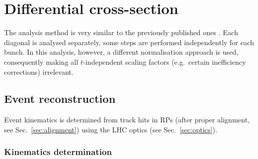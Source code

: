 \section{Differential cross-section}

The analysis method is very similar to the previously published ones \cite{prl111,epl101-el}. Each diagonal is analysed separately, some steps are performed independently for each bunch. In this analysis, however, a different normalisation approach is used, consequently making all $t$-independent scaling factors (e.g.~certain inefficiency corrections) irrelevant.

\subsection{Event reconstruction}

Event kinematics is determined from track hits in RPs (after proper alignment, see Sec.~\ref{sec:alignment}) using the LHC optics (see Sec.~\ref{sec:optics}).


\subsubsection{Kinematics determination}
\label{sec:kinematics}


